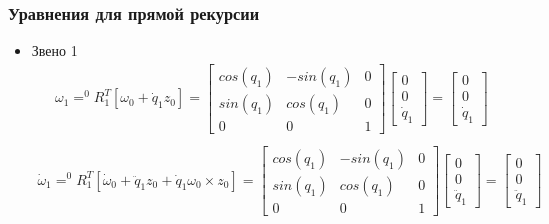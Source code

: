 \documentclass[a4paper,14pt]{extreport}
\begin{document}
\subsubsection{Уравнения для прямой рекурсии}

\begin{itemize}
	\item Звено 1
	\begin{align*}
	\omega_1 = ^0R_1^T [\omega_0 + \dot q_1 z_0] =
	\begin{bmatrix}
	cos(q_1) & -sin(q_1) & 0\\
	sin(q_1)& cos(q_1) & 0\\
	0&0 &1
	\end{bmatrix}
	\begin{bmatrix}
	0\\
	0\\
	\dot q_1
	\end{bmatrix}
	=
	\begin{bmatrix}
	0\\
	0\\
	\dot q_1
	\end{bmatrix}\\
	\end{align*}
	\begin{align*}
	\dot \omega_1 = ^0R_1^T [\dot \omega_0 + \ddot q_1 z_0 + \dot q_1 \omega_0 \times z_0] = 
	\begin{bmatrix}
	cos(q_1) & -sin(q_1) & 0\\
	sin(q_1)& cos(q_1) &0\\
	0&0 &1
	\end{bmatrix}			
	\begin{bmatrix}
	0\\
	0\\
	\ddot q_1
	\end{bmatrix}
	=
	\begin{bmatrix}
	0\\
	0\\
	\ddot q_1
	\end{bmatrix}\\
	\end{align*}	
	

\end{itemize}
\end{document}
